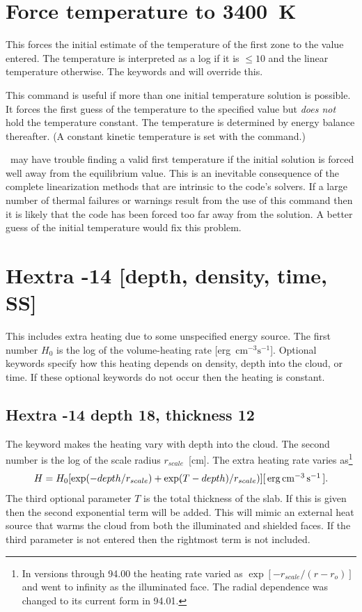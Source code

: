 \section{Force temperature to 3400~K}

This forces the initial estimate of the temperature of the first zone
to the value entered.  The temperature is interpreted as a log if it is
$\le 10$ and the linear temperature otherwise.
The keywords  and  will override this.

This command is useful if more than one initial temperature solution
is possible.
It forces the first guess of the temperature to the specified
value but \emph{does not} hold the temperature constant.
The temperature is
determined by energy balance thereafter.
(A constant kinetic temperature
is set with the  command.)

\Cloudy\ may have trouble finding a valid first temperature if the initial
solution is forced well away from the equilibrium value.
This is an
inevitable consequence of the complete linearization methods that are
intrinsic to the code's solvers.
If a large number of thermal failures
or warnings result from the use of this command then it is likely that the
code has been forced too far away from the solution.
A better guess of
the initial temperature would fix this problem.

\section{Hextra -14 [depth, density, time, SS]}

This includes extra heating due to some unspecified energy source.
The
first number $H_0$ is the log of the volume-heating rate
[erg~cm$^{-3}\mathrm{s}^{-1}$].
Optional keywords specify how this heating depends on density,
depth into the cloud, or time.
If these optional keywords do not occur then the heating
is constant.

\subsection{Hextra -14 depth 18, thickness 12}

The keyword  makes the heating vary with depth
into the cloud.
The
second number is the log of the scale radius $r_{scale}$~[cm].
The extra heating
rate varies as\footnote{In versions through 94.00 the heating rate
varied as
$\exp[-r_{scale}/(r-r_o)]$ and went to infinity as the illuminated face.  The radial
dependence was changed to its current form in 94.01.}
\begin{equation}
H = H_0 [\exp ( - depth/r_{scale} ) + \exp (T - depth)/r_{scale} )]
 [\ergpccmps ].%
\end{equation}
The third optional parameter $T$ is the total thickness of the slab.
If this
is given then the second exponential term will be added.
This will mimic
an external heat source that warms the cloud from both the illuminated and
shielded faces.
If the third parameter is not entered then the rightmost
term is not included.


